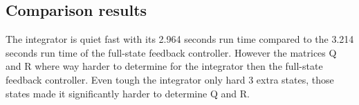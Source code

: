 \subsection{Comparison results}
The integrator is quiet fast with its 2.964 seconds run time compared to the 3.214 seconds run time of the full-state feedback controller. However the matrices Q and R where way harder to determine for the integrator then the full-state feedback controller. Even tough the integrator only hard 3 extra states, those states made it significantly harder to determine Q and R.


